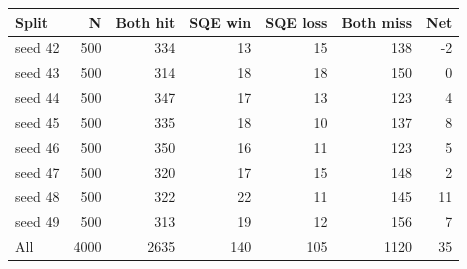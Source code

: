 \begin{tabular}{lrrrrrr}
\toprule
Split & N & Both hit & SQE win & SQE loss & Both miss & Net \\
\midrule
seed 42 & 500 & 334 & 13 & 15 & 138 & -2 \\
seed 43 & 500 & 314 & 18 & 18 & 150 & 0 \\
seed 44 & 500 & 347 & 17 & 13 & 123 & 4 \\
seed 45 & 500 & 335 & 18 & 10 & 137 & 8 \\
seed 46 & 500 & 350 & 16 & 11 & 123 & 5 \\
seed 47 & 500 & 320 & 17 & 15 & 148 & 2 \\
seed 48 & 500 & 322 & 22 & 11 & 145 & 11 \\
seed 49 & 500 & 313 & 19 & 12 & 156 & 7 \\
\midrule
All & 4000 & 2635 & 140 & 105 & 1120 & 35 \\
\bottomrule
\end{tabular}
